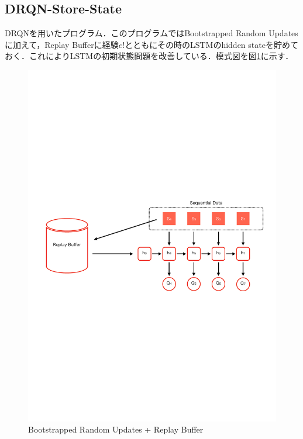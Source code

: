 \documentclass{eithesis}
\begin{document}
    \subsection{DRQN-Store-State}\label{sec_ss}
      DRQNを用いたプログラム．このプログラムではBootstrapped Random Updatesに加えて，Replay Bufferに経験$e!$とともにその時のLSTMのhidden stateを貯めておく．これによりLSTMの初期状態問題を改善している．模式図を図\ref{fig_storedState}に示す．
      \begin{figure}[htbp]
        \centering
        \includegraphics[width=12cm]{./images/storedState.pdf}
        \caption{Bootstrapped Random Updates + Replay Buffer}
        \label{fig_storedState}
      \end{figure}
\end{document}
